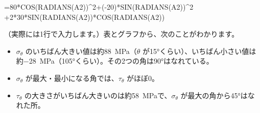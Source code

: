 \begin{phcode}[表計算（B2）]
=80*COS(RADIANS(A2))\^{}2+(-20)*SIN(RADIANS(A2))\^{}2
 +2*30*SIN(RADIANS(A2))*COS(RADIANS(A2))
\end{phcode}
（実際には1行で入力します。）表とグラフから、次のことがわかります。
\begin{itemize}[leftmargin=1.2\zw, itemsep=1pt, topsep=1pt, label={\color{bkTheme}●}]
\item $\sigma_\theta$ のいちばん大きい値は約\qty{88}{MPa}（$\theta$ が15°くらい）、いちばん小さい値は約\qty{-28}{MPa}（105°くらい）。その2つの角は90°はなれている。
\item $\sigma_\theta$ が最大・最小になる角では、$\tau_\theta$ がほぼ0。
\item $\tau_\theta$ の大きさがいちばん大きいのは約\qty{58}{MPa}で、$\sigma_\theta$ が最大の角から45°はなれた所。
\end{itemize}

